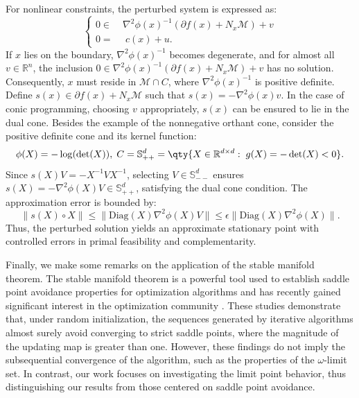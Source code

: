 \documentclass[11pt]{article}
\newcommand{\R}{\mathbb R}
\newcommand{\cM}{\mathcal M}
\begin{document}
For nonlinear constraints, the perturbed system is expressed as:
\[
\left\{
\begin{aligned}
0\in\;&\nabla^2\phi(x)^{-1}(\partial f(x)+N_x\cM)+v\\
0=&\;c(x)+u.
\end{aligned}\right.
\]
If $ x $ lies on the boundary, $ \nabla^2 \phi(x)^{-1} $ becomes degenerate, and for almost all $ v \in \mathbb{R}^n $, the inclusion $ 0 \in \nabla^2 \phi(x)^{-1} \left( \partial f(x) + N_x \mathcal{M} \right) + v $ has no solution. Consequently, $ x $ must reside in $ \mathcal{M} \cap C $, where $ \nabla^2 \phi(x)^{-1} $ is positive definite. Define $ s(x) \in \partial f(x) + N_x \mathcal{M} $ such that $ s(x) = -\nabla^2 \phi(x) v $. In the case of conic programming, choosing $ v $ appropriately, $ s(x) $ can be ensured to lie in the dual cone. Besides the example of the nonnegative orthant cone, consider the positive definite cone and its kernel function:
\[
\phi(X)=-\log({\rm det}(X)),\; C=\mathbb{S}^d_{++}=\qty{X\in\R^{d\times d}:\;g(X)=-\det(X)<0}.
\]
Since $s(X)V=-X^{-1}VX^{-1}$, selecting $ V \in \mathbb{S}_{--}^d $ ensures $ s(X) = -\nabla^2 \phi(X) V \in \mathbb{S}_{++}^d $, satisfying the dual cone condition. The approximation error is bounded by:
$$\| s(X) \circ X \| \leq \| \text{Diag}(X) \nabla^2 \phi(X) V \| \leq \epsilon \| \text{Diag}(X) \nabla^2 \phi(X) \|.$$
Thus, the perturbed solution yields an approximate stationary point with controlled errors in primal feasibility and complementarity.


Finally, we make some remarks on the application of the stable manifold theorem. The stable manifold theorem \cite{shub2013global} is a powerful tool used to establish saddle point avoidance properties for optimization algorithms and has recently gained significant interest in the optimization community \cite{lee2016gradient,panageas2016gradient,lee2019first,panageas2019first,davis2021subgradient,hsieh2023riemannian}. These studies demonstrate that, under random initialization, the sequences generated by iterative algorithms almost surely avoid converging to strict saddle points, where the magnitude of the updating map is greater than one. However, these findings do not imply the subsequential convergence of the algorithm, such as the properties of the \(\omega\)-limit set. In contrast, our work focuses on investigating the limit point behavior, thus distinguishing our results from those centered on saddle point avoidance.
\end{document}
